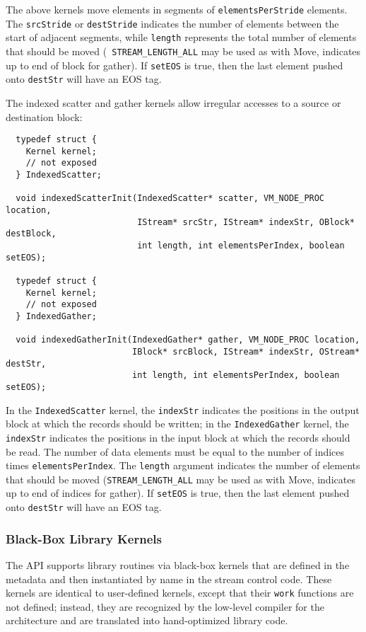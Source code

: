 The above kernels move elements in segments of {\tt elementsPerStride}
elements. The {\tt srcStride} or {\tt destStride} indicates the number
of elements between the start of adjacent segments, while {\tt length}
represents the total number of elements that should be moved ({\tt
STREAM\_LENGTH\_ALL} may be used as with Move, indicates up to end of
block for gather).  If {\tt setEOS} is true, then the last element
pushed onto {\tt destStr} will have an EOS tag.

The indexed scatter and gather kernels allow irregular accesses to a
source or destination block:

{\small \begin{verbatim}
  typedef struct {
    Kernel kernel;
    // not exposed
  } IndexedScatter;

  void indexedScatterInit(IndexedScatter* scatter, VM_NODE_PROC location,
                          IStream* srcStr, IStream* indexStr, OBlock* destBlock, 
                          int length, int elementsPerIndex, boolean setEOS);
                     
  typedef struct {
    Kernel kernel;
    // not exposed
  } IndexedGather;

  void indexedGatherInit(IndexedGather* gather, VM_NODE_PROC location, 
                         IBlock* srcBlock, IStream* indexStr, OStream* destStr, 
                         int length, int elementsPerIndex, boolean setEOS);
\end{verbatim}}

In the {\tt IndexedScatter} kernel, the {\tt indexStr} indicates the
positions in the output block at which the records should be written;
in the {\tt IndexedGather} kernel, the {\tt indexStr} indicates the
positions in the input block at which the records should be read. The
number of data elements must be equal to the number of indices times
{\tt elementsPerIndex}. The {\tt length} argument indicates the number
of elements that should be moved ({\tt STREAM\_LENGTH\_ALL} may be
used as with Move, indicates up to end of indices for gather).  If
{\tt setEOS} is true, then the last element pushed onto {\tt destStr}
will have an EOS tag.

\subsubsection{Black-Box Library Kernels}
\label{sec:kernelllc}

The API supports library routines via black-box kernels that are
defined in the metadata and then instantiated by name in the stream
control code.  These kernels are identical to user-defined kernels,
except that their {\tt work} functions are not defined; instead, they
are recognized by the low-level compiler for the architecture and are
translated into hand-optimized library code.

